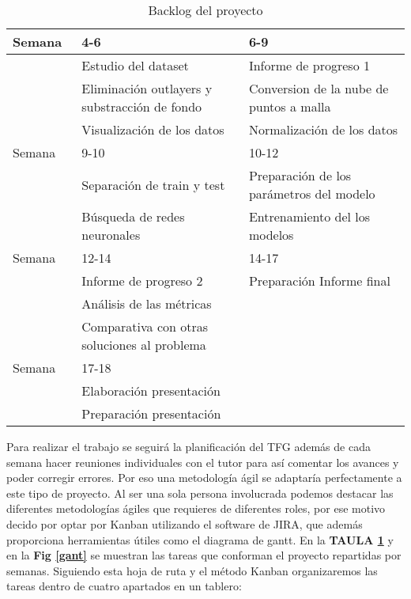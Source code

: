 \documentclass[12pt,a4paper]{article}
\begin{document}
\begin{table}[!]
\centering
\begin{tabular}{|l|l|l|} 
\hline
Semana~ & 4-6                                           & 6-9                                       \\ 
\hline
        & Estudio del dataset                           & Informe de progreso 1                     \\
        & Eliminación outlayers y substracción de fondo & Conversion de la nube de puntos a malla   \\
        & Visualización de los datos                    & Normalización de los datos                \\ 
\hline
Semana  & 9-10                                          & 10-12                                     \\ 
\hline
        & Separación de train y test                    & Preparación de los parámetros del modelo  \\
        & Búsqueda de redes neuronales                  & Entrenamiento del los modelos             \\ 
\hline
Semana  & 12-14                                         & 14-17                                     \\ 
\hline
        & Informe de progreso 2                         & Preparación Informe final~                \\
        & Análisis de las métricas                      &                                           \\
        & Comparativa con otras soluciones al problema  &                                           \\ 
\hline
Semana  & 17-18                                         &                                           \\ 
\hline
        & Elaboración presentación                      &                                           \\
        & Preparación presentación                      &                                           \\
\hline
\end{tabular}
\caption{Backlog del proyecto}
\label{t:tabla}
\end{table}




Para realizar el trabajo se seguirá la planificación del TFG además de cada semana hacer reuniones individuales con el tutor para así comentar los avances y poder corregir errores. Por eso una metodología ágil se adaptaría perfectamente a este tipo de proyecto. Al ser una sola persona involucrada podemos destacar las diferentes metodologías ágiles que requieres de diferentes roles, por ese motivo decido por optar por Kanban utilizando el software de JIRA, que además proporciona herramientas útiles como el diagrama de gantt.
En la \textbf{TAULA \ref{t:tabla}} y en la \textbf{Fig \ref{gant}} se muestran las tareas que conforman el proyecto repartidas por semanas. Siguiendo esta hoja de ruta y el método Kanban organizaremos las tareas dentro de cuatro apartados en un tablero:
\end{document}
